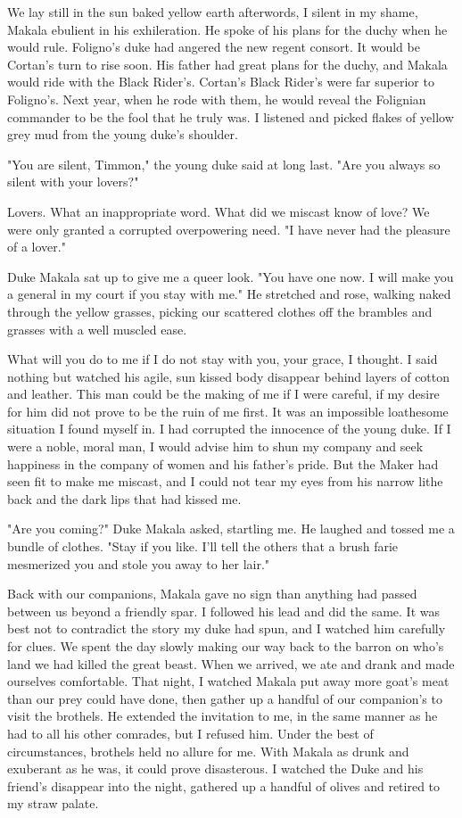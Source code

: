 \documentclass{article}
\begin{document}
We lay still in the sun baked yellow earth afterwords, I silent in my shame, Makala ebulient in his exhileration. He spoke of his plans for the duchy when he would rule. Foligno's duke had angered the new regent consort. It would be Cortan's turn to rise soon. His father had great plans for the duchy, and Makala would ride with the Black Rider's. Cortan's Black Rider's were far superior to Foligno's. Next year, when he rode with them, he would reveal the Folignian commander to be the fool that he truly was. I listened and picked flakes of yellow grey mud from the young duke's shoulder. 

"You are silent, Timmon," the young duke said at long last. "Are you always so silent with your lovers?"

Lovers. What an inappropriate word. What did we miscast know of love? We were only granted a corrupted overpowering need. "I have never had the pleasure of a lover."

Duke Makala sat up to give me a queer look. "You have one now. I will make you a general in my court if you stay with me." He stretched and rose, walking naked through the yellow grasses, picking our scattered clothes off the brambles and grasses with a well muscled ease.

What will you do to me if I do not stay with you, your grace, I thought. I said nothing but watched his agile, sun kissed body disappear behind layers of cotton and leather. This man could be the making of me if I were careful, if my desire for him did not prove to be the ruin of me first. It was an impossible loathesome situation I found myself in. I had corrupted the innocence of the young duke. If I were a noble, moral man, I would advise him to shun my company and seek happiness in the company of women and his father's pride. But the Maker had seen fit to make me miscast, and I could not tear my eyes from his narrow lithe back and the dark lips that had kissed me.

"Are you coming?" Duke Makala asked, startling me. He laughed and tossed me a bundle of clothes. "Stay if you like. I'll tell the others that a brush farie mesmerized you and stole you away to her lair."

\vspace{.5cm}

Back with our companions, Makala gave no sign than anything had passed between us beyond a friendly spar. I followed his lead and did the same. It was best not to contradict the story my duke had spun, and I watched him carefully for clues. We spent the day slowly making our way back to the barron on who's land we had killed the great beast. When we arrived, we ate and drank and made ourselves comfortable. That night, I watched Makala put away more goat's meat than our prey could have done, then gather up a handful of our companion's to visit the brothels. He extended the invitation to me, in the same manner as he had to all his other comrades, but I refused him. Under the best of circumstances, brothels held no allure for me. With Makala as drunk and exuberant as he was, it could prove disasterous. I watched the Duke and his friend's disappear into the night, gathered up a handful of olives and retired to my straw palate.
\end{document}

